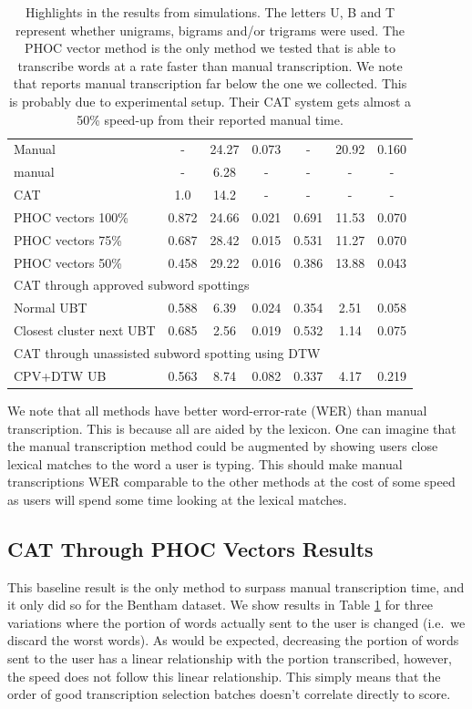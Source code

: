 \documentclass[ms,electronic,twosidetoc,letterpaper,chaptercenter,parttop,lof,lot]{byumsphd}
\begin{document}
\begin{table}
\begin{tabular}{| l | c  c  c | c c c |}
  Manual             & -   & 24.27 & 0.073 &  -   & 20.92 & 0.160 \\
  \cite{Zagoris2015} manual & -   & 6.28 & - &  -   & -& - \\
  \cite{Zagoris2015} CAT & 1.0   & 14.2 & - &  -   & -& - \\
  \hline	
  PHOC vectors 100\% & 0.872 & 24.66 & 0.021 &  0.691 & 11.53 & 0.070 \\
  PHOC vectors 75\%  & 0.687 & 28.42 & 0.015 &  0.531 & 11.27 & 0.070 \\
  PHOC vectors 50\%  & 0.458 & 29.22 & 0.016 &  0.386 & 13.88 & 0.043 \\
  \hline	
  \multicolumn{7}{|l|}{CAT through approved subword spottings} \\
  Normal UBT & 0.588 & 6.39 & 0.024 &  0.354 & 2.51 & 0.058 \\
  Closest cluster next UBT & 0.685 & 2.56 & 0.019 & 0.532 & 1.14 & 0.075 \\
  \hline	
  \multicolumn{7}{|l|}{CAT through unassisted subword spotting using DTW} \\
  CPV+DTW UB & 0.563 & 8.74 & 0.082 & 0.337 & 4.17 & 0.219  \\
  \hline  
\end{tabular}
\caption{Highlights in the results from simulations. The letters U, B and T represent whether unigrams, bigrams and/or trigrams were used. The PHOC vector method is the only method we tested that is able to transcribe words at a rate faster than manual transcription. We note that \cite{Zagoris2015} reports manual transcription far below the one we collected. This is probably due to experimental setup. Their CAT system gets almost a 50\% speed-up from their reported manual time.}
\label{tab:finalresults}
\end{table}

We note that all methods have better word-error-rate (WER) than manual transcription. This is because all are aided by the lexicon. One can imagine that the manual transcription method could be augmented by showing users close lexical matches to the word a user is typing. This should make manual transcriptions WER comparable to the other methods at the cost of some speed as users will spend some time looking at the lexical matches.


\subsection{CAT Through PHOC Vectors Results}
This baseline result is the only method to surpass manual transcription time, and it only did so for the Bentham dataset. We show results in Table \ref{tab:finalresults} for three variations where the portion of words actually sent to the user is changed (i.e.~we discard the worst words). As would be expected, decreasing the portion of words sent to the user has a linear relationship with the portion transcribed, however, the speed does not follow this linear relationship. This simply means that the order of good transcription selection batches doesn't correlate directly to score.
\end{document}
